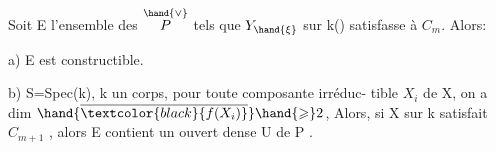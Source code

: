 Soit E l'ensemble des \hand{$\xi \in$} $\overset{\hand{\vee}}{P}$  tels que  $Y_{\hand{\xi}}$ sur k(\hand{$\xi$}) satisfasse à $C_m$.
Alors:

a)  E est constructible.

b)    S=Spec(k), k un corps,   pour toute composante irréduc-%
tible  $X_i$ de X, on a dim $\hand{\overline{\textcolor{black}{f(X_i)}}} \hand{\geqslant} 2$, Alors, si X sur k satisfait $C_{m+1}$ ,
alors E\hand{$_{\xi}$} contient un ouvert dense U de P .


